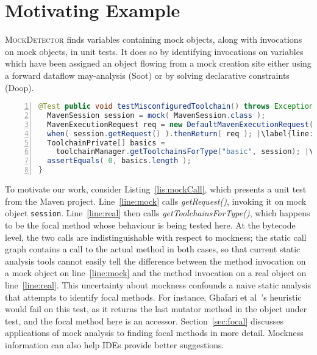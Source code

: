 \section{Motivating Example}
\label{sec:motivating-example}

\textsc{MockDetector} finds variables containing mock objects, along with invocations on mock objects, in unit tests. It does so by identifying invocations on variables which have been assigned an object flowing from a mock creation site either using a forward dataflow may-analysis (Soot) or by solving declarative constraints (Doop).

\begin{lstlisting}[basicstyle=\ttfamily, caption={Code from maven-core; calls to focal method \texttt{getToolchainsForType()} and to mock \texttt{session}'s \texttt{getRequest()} method occur in \textit{testMisconfiguredToolchain()}.},
numbers=left,numbersep=2pt,basicstyle=\scriptsize\ttfamily,language = Java, framesep=4.5mm, escapechar=|,
framexleftmargin=1.0mm, captionpos=b, label=lis:mockCall, morekeywords={@Test}]
@Test public void testMisconfiguredToolchain() throws Exception {
  MavenSession session = mock( MavenSession.class );
  MavenExecutionRequest req = new DefaultMavenExecutionRequest();
  when( session.getRequest() ).thenReturn( req ); |\label{line:mock}|
  ToolchainPrivate[] basics =
    toolchainManager.getToolchainsForType("basic", session); |\label{line:real}|
  assertEquals( 0, basics.length );
}
\end{lstlisting}

To motivate our work, consider Listing~\ref{lis:mockCall}, which presents a unit test from the Maven project. Line~\ref{line:mock} calls \textit{getRequest()}, invoking it on mock object \texttt{session}. Line~\ref{line:real} then calls \textit{getToolchainsForType()}, which happens to be the focal method whose behaviour is being tested here. At the bytecode level, the two calls are indistinguishable with respect to mockness; the static call graph contains a call to the actual method in both cases, so that current static analysis tools cannot easily tell the difference between the method invocation on a mock object on line~\ref{line:mock} and the method invocation on a real object on line~\ref{line:real}. This uncertainty about mockness confounds a naive static analysis that attempts to identify focal methods. For instance, Ghafari et al~\cite{ghafari15:_autom}'s heuristic would fail on this test, as it returns the last mutator method in the object under test, and the focal method here is an accessor. Section~\ref{sec:focal} discusses applications of mock analysis to finding focal methods in more detail. Mockness information can also help IDEs provide better suggestions. 


